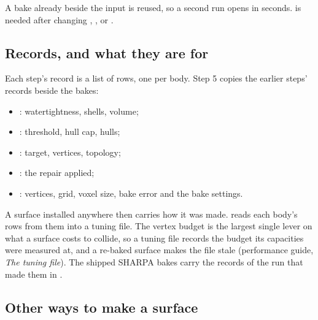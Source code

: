 A bake already beside the input is reused, so a second run opens in seconds.  is needed after changing , ,  or .

\subsection{Records, and what they are for}\label{sec:records}

Each step's record is a list of rows, one per body. Step 5 copies the earlier steps' records beside the bakes:

\begin{itemize}
\item {}: watertightness, shells, volume;
\item {}: threshold, hull cap, hulls;
\item {}: target, vertices, topology;
\item {}: the repair applied;
\item {}: vertices, grid, voxel size, bake error and the bake settings.
\end{itemize}

A surface installed anywhere then carries how it was made.  reads each body's rows from them into a tuning file. The vertex budget is the largest single lever on what a surface costs to collide, so a tuning file records the budget its capacities were measured at, and a re-baked surface makes the file stale (performance guide, \emph{The tuning file}). The shipped SHARPA bakes carry the records of the run that made them in .

\subsection{Other ways to make a surface}\label{sec:other}

